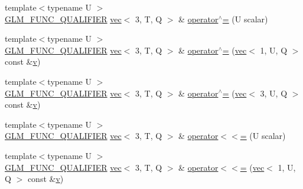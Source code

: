 \begin{DoxyCompactItemize}
\item 
{\footnotesize template$<$typename U $>$ }\\\mbox{\hyperlink{setup_8hpp_a33fdea6f91c5f834105f7415e2a64407}{G\+L\+M\+\_\+\+F\+U\+N\+C\+\_\+\+Q\+U\+A\+L\+I\+F\+I\+ER}} \mbox{\hyperlink{structglm_1_1vec}{vec}}$<$ 3, T, Q $>$ \& \mbox{\hyperlink{structglm_1_1vec_3_013_00_01_t_00_01_q_01_4_a81a4abd8c10a0585a35987317d6cb87f}{operator$^\wedge$=}} (U scalar)
\item 
{\footnotesize template$<$typename U $>$ }\\\mbox{\hyperlink{setup_8hpp_a33fdea6f91c5f834105f7415e2a64407}{G\+L\+M\+\_\+\+F\+U\+N\+C\+\_\+\+Q\+U\+A\+L\+I\+F\+I\+ER}} \mbox{\hyperlink{structglm_1_1vec}{vec}}$<$ 3, T, Q $>$ \& \mbox{\hyperlink{structglm_1_1vec_3_013_00_01_t_00_01_q_01_4_af7af47fbde4d53045b59d69a7563eba7}{operator$^\wedge$=}} (\mbox{\hyperlink{structglm_1_1vec}{vec}}$<$ 1, U, Q $>$ const \&\mbox{\hyperlink{_s_d_l__opengl_8h_a10a82eabcb59d2fcd74acee063775f90}{v}})
\item 
{\footnotesize template$<$typename U $>$ }\\\mbox{\hyperlink{setup_8hpp_a33fdea6f91c5f834105f7415e2a64407}{G\+L\+M\+\_\+\+F\+U\+N\+C\+\_\+\+Q\+U\+A\+L\+I\+F\+I\+ER}} \mbox{\hyperlink{structglm_1_1vec}{vec}}$<$ 3, T, Q $>$ \& \mbox{\hyperlink{structglm_1_1vec_3_013_00_01_t_00_01_q_01_4_abff32960a1defbf3301e8caa8c9fa1f6}{operator$^\wedge$=}} (\mbox{\hyperlink{structglm_1_1vec}{vec}}$<$ 3, U, Q $>$ const \&\mbox{\hyperlink{_s_d_l__opengl_8h_a10a82eabcb59d2fcd74acee063775f90}{v}})
\item 
{\footnotesize template$<$typename U $>$ }\\\mbox{\hyperlink{setup_8hpp_a33fdea6f91c5f834105f7415e2a64407}{G\+L\+M\+\_\+\+F\+U\+N\+C\+\_\+\+Q\+U\+A\+L\+I\+F\+I\+ER}} \mbox{\hyperlink{structglm_1_1vec}{vec}}$<$ 3, T, Q $>$ \& \mbox{\hyperlink{structglm_1_1vec_3_013_00_01_t_00_01_q_01_4_a473a7e56a46f30b068af234b3babd712}{operator$<$$<$=}} (U scalar)
\item 
{\footnotesize template$<$typename U $>$ }\\\mbox{\hyperlink{setup_8hpp_a33fdea6f91c5f834105f7415e2a64407}{G\+L\+M\+\_\+\+F\+U\+N\+C\+\_\+\+Q\+U\+A\+L\+I\+F\+I\+ER}} \mbox{\hyperlink{structglm_1_1vec}{vec}}$<$ 3, T, Q $>$ \& \mbox{\hyperlink{structglm_1_1vec_3_013_00_01_t_00_01_q_01_4_a4db1d87628b5f4ee744873e4affc61e5}{operator$<$$<$=}} (\mbox{\hyperlink{structglm_1_1vec}{vec}}$<$ 1, U, Q $>$ const \&\mbox{\hyperlink{_s_d_l__opengl_8h_a10a82eabcb59d2fcd74acee063775f90}{v}})
\item 

\end{DoxyCompactItemize}
